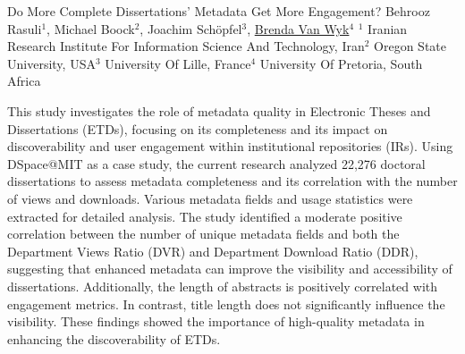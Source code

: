 

    \begin{abstract_online}{Do More Complete Dissertations' Metadata Get More Engagement?}{%
    Behrooz Rasuli$^{1}$, Michael Boock$^{2}$, Joachim Schöpfel$^{3}$, \underline{Brenda Van Wyk}$^{4}$}{%
    }{%
    $^1$ Iranian Research Institute For Information Science And Technology, Iran\newline{}$^2$ Oregon State University, USA\newline{}$^3$ University Of Lille, France\newline{}$^4$ University Of Pretoria, South Africa
}
    
    This study investigates the role of metadata quality in Electronic Theses and Dissertations (ETDs), focusing on its completeness and its impact on discoverability and user engagement within institutional repositories (IRs). Using DSpace@MIT as a case study, the current research analyzed 22,276 doctoral dissertations to assess metadata completeness and its correlation with the number of views and downloads. Various metadata fields and usage statistics were extracted for detailed analysis. The study identified a moderate positive correlation between the number of unique metadata fields and both the Department Views Ratio (DVR) and Department Download Ratio (DDR), suggesting that enhanced metadata can improve the visibility and accessibility of dissertations. Additionally, the length of abstracts is positively correlated with engagement metrics. In contrast, title length does not significantly influence the visibility. These findings showed the importance of high-quality metadata in enhancing the discoverability of ETDs.
\end{abstract_online}

    
